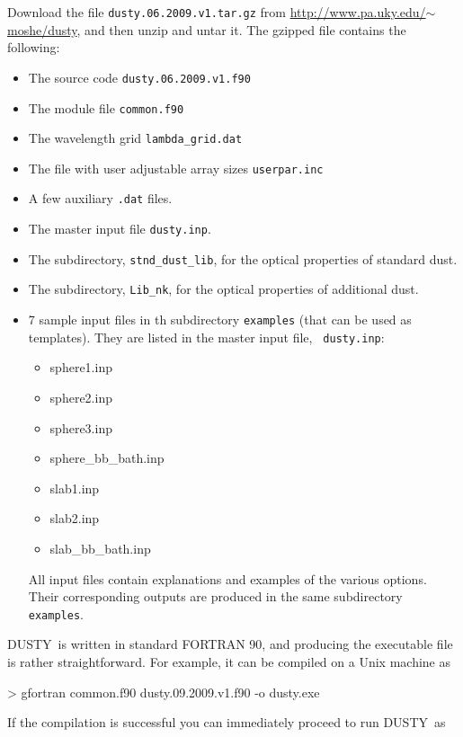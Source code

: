 \documentclass[11pt]{article}
\def\D  {{\sf DUSTY}}
\begin{document}
Download the file {\tt dusty.06.2009.v1.tar.gz} from
\href{http://www.pa.uky.edu/~moshe/dusty}
{http://www.pa.uky.edu/$\sim$moshe/dusty}, and then unzip and untar it. The
gzipped file contains the following:
%
\begin{itemize}
%
\item The source code {\tt dusty.06.2009.v1.f90}
%
\item The module file {\tt common.f90}
%
\item The wavelength grid {\tt lambda\_grid.dat}
%
\item The file with user adjustable array sizes  {\tt userpar.inc}
%
\item A few auxiliary {\tt \*.dat} files.
%
\item The master input file {\tt dusty.inp}.
%
\item The subdirectory, {\tt stnd\_dust\_lib}, for the optical properties
    of standard dust.
%
\item The subdirectory, {\tt Lib\_nk}, for the optical properties of
    additional dust.
%
\item 7 sample input files in th subdirectory {\tt examples} (that can be
    used as templates). They are listed in the master input file, {\tt
    dusty.inp}:
%
\begin{itemize}
%
\item sphere1.inp
%
\item sphere2.inp
%
\item sphere3.inp
%
\item sphere\_bb\_bath.inp
%
\item slab1.inp
%
\item slab2.inp
%
\item slab\_bb\_bath.inp
\end{itemize}

All input files contain explanations and examples of the various options.
Their corresponding outputs are produced in the same subdirectory {\tt
examples}.
\end{itemize}

\D\ is written in standard FORTRAN 90, and producing the executable file is
rather straightforward.  For example, it can be compiled on a Unix machine as

\bigskip

{\tt

> gfortran common.f90 dusty.09.2009.v1.f90 -o dusty.exe
}

\bigskip\noindent If the compilation is successful you can immediately proceed
to run \D\ as
\end{document}
